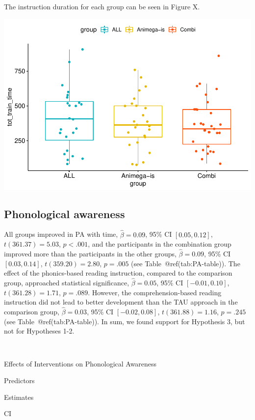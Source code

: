\documentclass[
]{article}
\begin{document}
The instruction duration for each group can be seen in Figure X.

\includegraphics{Effects_of_training_files/figure-latex/tottraintime-plot-1.pdf}

\hypertarget{phonological-awareness-1}{%
\subsection{Phonological awareness}\label{phonological-awareness-1}}

All groups improved in PA with time, \(\hat{\beta} = 0.09\), 95\% CI
\([0.05, 0.12]\), \(t(361.37) = 5.03\), \(p < .001\), and the
participants in the combination group improved more than the
participants in the other groups, \(\hat{\beta} = 0.09\), 95\% CI
\([0.03, 0.14]\), \(t(359.20) = 2.80\), \(p = .005\) (see
Table~@ref(tab:PA-table)). The effect of the phonics-based reading
instruction, compared to the comparison group, approached statistical
significance, \(\hat{\beta} = 0.05\), 95\% CI \([-0.01, 0.10]\),
\(t(361.28) = 1.71\), \(p = .089\). However, the comprehension-based
reading instruction did not lead to better development than the TAU
approach in the comparison group, \(\hat{\beta} = 0.03\), 95\% CI
\([-0.02, 0.08]\), \(t(361.88) = 1.16\), \(p = .245\) (see
Table~@ref(tab:PA-table)). In sum, we found support for Hypothesis 3,
but not for Hypotheses 1-2.

~

Effects of Interventions on Phonological Awareness

Predictors

Estimates

CI
\end{document}
